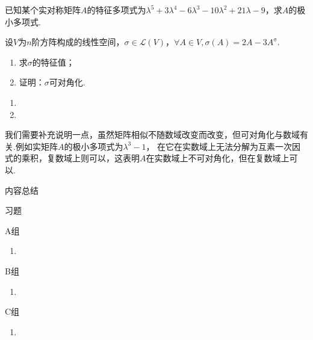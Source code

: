 \begin{example}
    已知某个实对称矩阵$A$的特征多项式为$\lambda^5+3\lambda^4-6\lambda^3-10\lambda^2+21\lambda-9$，求$A$的极小多项式.
\end{example}
\begin{solution}

\end{solution}

\begin{example}
    设$V$为$n$阶方阵构成的线性空间，$\sigma\in \mathcal{L}(V)$，$\forall A\in V, \sigma(A)=2A-3A^{\mathrm{\sigma}}$.
    \begin{enumerate}[label=(\arabic*)]
        \item 求$\sigma$的特征值；

        \item 证明：$\sigma$可对角化.
    \end{enumerate}
\end{example}
\begin{solution}
    \begin{enumerate}[label=(\arabic*)]
        \item 
        \item 
    \end{enumerate}
\end{solution}

我们需要补充说明一点，虽然矩阵相似不随数域改变而改变，但可对角化与数域有关.例如实矩阵$A$的极小多项式为$\lambda^3-1$，
在它在实数域上无法分解为互素一次因式的乘积，复数域上则可以，这表明$A$在实数域上不可对角化，但在复数域上可以.

\vspace{2ex}
\centerline{\heiti \Large 内容总结}

\vspace{2ex}

\centerline{\heiti \Large 习题}
\vspace{2ex}
{\kaishu }
\begin{flushright}
    \kaishu

\end{flushright}
\centerline{\heiti A组}
\begin{enumerate}
    \item
\end{enumerate}
\centerline{\heiti B组}
\begin{enumerate}
    \item
\end{enumerate}
\centerline{\heiti C组}
\begin{enumerate}
    \item
\end{enumerate}
